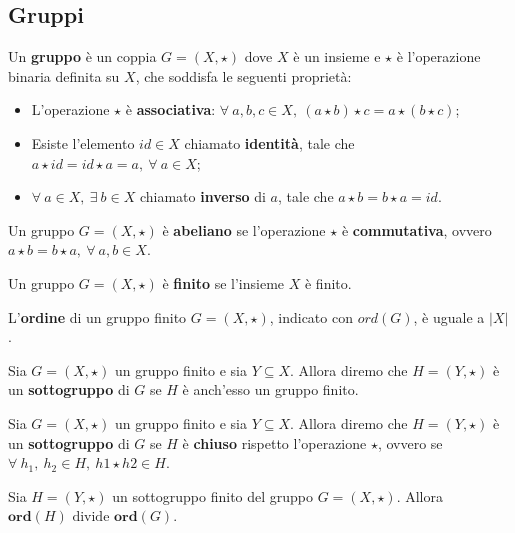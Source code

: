\subsection{Gruppi}

\begin{de}[Gruppo]
	Un \textbf{gruppo} è un coppia $G = (X, \star)$ dove $X$ è un insieme e $\star$ è l'operazione binaria definita su $X$, che soddisfa le seguenti proprietà:
	\begin{itemize}
		\item L'operazione $\star$ è \textbf{associativa}: $\forall\ a, b, c \in X,\ (a \star b) \star c = a \star (b \star c)$;
		\item Esiste l'elemento $id \in X$ chiamato \textbf{identità}, tale che $a \star id = id \star a = a,\ \forall\ a \in X$;
		\item $\forall\ a \in X,\ \exists\ b\in X$ chiamato \textbf{inverso} di $a$, tale che $a \star b = b \star a = id$.
	\end{itemize}
\end{de}

\begin{de}
	Un gruppo $G = (X, \star)$ è \textbf{abeliano} se l'operazione $\star$ è \textbf{commutativa}, ovvero $a \star b = b \star a,\ \forall\ a,b \in X $.
\end{de}

\begin{de}
	Un gruppo $G = (X, \star)$ è \textbf{finito} se l'insieme $X$ è finito.
\end{de}

\begin{de}
	L'\textbf{ordine} di un gruppo finito $G = (X, \star)$, indicato con $ord(G)$, è uguale a $|X|$.
\end{de}

\begin{de}[Sottogruppo]
    Sia $G = (X, \star)$ un gruppo finito e sia $Y \subseteq X$. Allora diremo che $H = (Y, \star)$ è un \textbf{sottogruppo} di $G$ se $H$ è anch'esso un gruppo finito.
\end{de}

\begin{theorem}
    Sia $G = (X, \star)$ un gruppo finito e sia $Y \subseteq X$. Allora diremo che $H = (Y, \star)$ è un \textbf{sottogruppo} di $G$ se $H$ è \textbf{chiuso} rispetto l'operazione $\star$, ovvero se $\forall\ h_1,\ h_2 \in H,\ h1 \star h2 \in H$.
\end{theorem}

\begin{theorem}\label{thm:lagrange}
    Sia $H = (Y, \star)$ un sottogruppo finito del gruppo $G = (X, \star)$.
    Allora $\textbf{ord}(H) \text{ divide } \textbf{ord}(G)$.
\end{theorem}

